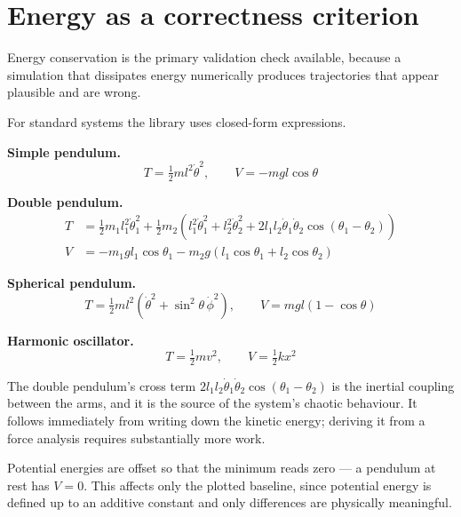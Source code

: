 \documentclass[11pt,a4paper]{article}
\begin{document}
\section{Energy as a correctness criterion}
\label{sec:energy}

Energy conservation is the primary validation check available, because a simulation that dissipates
energy numerically produces trajectories that appear plausible and are wrong.

For standard systems the library uses closed-form expressions.

\medskip
\noindent\textbf{Simple pendulum.}
\begin{equation}
T = \tfrac{1}{2}ml^2\dot\theta^2, \qquad V = -mgl\cos\theta
\end{equation}

\noindent\textbf{Double pendulum.}
\begin{align}
T &= \tfrac{1}{2}m_1 l_1^2\dot\theta_1^2
   + \tfrac{1}{2}m_2\!\left(l_1^2\dot\theta_1^2 + l_2^2\dot\theta_2^2
   + 2l_1 l_2 \dot\theta_1\dot\theta_2\cos(\theta_1 - \theta_2)\right) \\
V &= -m_1 g l_1\cos\theta_1 - m_2 g\left(l_1\cos\theta_1 + l_2\cos\theta_2\right)
\end{align}

\noindent\textbf{Spherical pendulum.}
\begin{equation}
T = \tfrac{1}{2}ml^2\!\left(\dot\theta^2 + \sin^2\!\theta\,\dot\phi^2\right), \qquad
V = mgl(1 - \cos\theta)
\end{equation}

\noindent\textbf{Harmonic oscillator.}
\begin{equation}
T = \tfrac{1}{2}mv^2, \qquad V = \tfrac{1}{2}kx^2
\end{equation}

\medskip
The double pendulum's cross term $2l_1 l_2\dot\theta_1\dot\theta_2\cos(\theta_1 - \theta_2)$ is the
inertial coupling between the arms, and it is the source of the system's chaotic behaviour. It
follows immediately from writing down the kinetic energy; deriving it from a force analysis requires
substantially more work.

Potential energies are offset so that the minimum reads zero --- a pendulum at rest has $V = 0$. This
affects only the plotted baseline, since potential energy is defined up to an additive constant and
only differences are physically meaningful.
\end{document}
